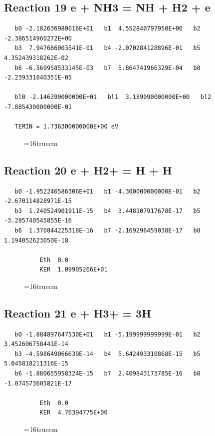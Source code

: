 \documentclass[12pt,dvipdfm]{article}
\begin{document}
\subsection{
Reaction 19 e + NH3 = NH + H2 + e }
\begin{small}\begin{verbatim}
   b0 -2.182636980016E+01   b1  4.552840797950E+00   b2 -2.386514960272E+00
   b3  7.947686003541E-01   b4 -2.070284128896E-01   b5  4.352439318262E-02
   b6 -6.569958533145E-03   b7  5.864741966329E-04   b8 -2.239331040351E-05

   bl0 -2.146390000000E+01   bl1  3.189090000000E+00   bl2 -7.885430000000E-01

   TEMIN = 1.736300000000E+00 eV
\end{verbatim}\end{small}
\begin{figure}[h!] \label{n2rates}
\epsfxsize=16truecm
\end{figure}
\newpage

\subsection{
Reaction 20 e + H2+ = H + H }
\begin{small}\begin{verbatim}
   b0 -1.952246586306E+01   b1 -4.300000000000E-01   b2 -2.670114828971E-15
   b3  1.240524901911E-15   b4  3.448107917678E-17   b5 -3.285740545855E-16
   b6  1.370844225318E-16   b7 -2.169296459038E-17   b8  1.194052623050E-18

          Eth  0.0
          KER  1.09905266E+01

\end{verbatim}\end{small}
\begin{figure}[h!] \label{n2rates}
\epsfxsize=16truecm
\end{figure}
\newpage

\subsection{
Reaction 21 e + H3+ = 3H }
\begin{small}\begin{verbatim}
   b0 -1.884897647530E+01   b1 -5.199999999999E-01   b2  3.452606758441E-14
   b3 -4.598649066639E-14   b4  5.642493310868E-15   b5  5.045818211316E-15
   b6 -1.880655958324E-15   b7  2.409843173785E-16   b8 -1.074573605821E-17

          Eth  0.0
          KER  4.76394775E+00

\end{verbatim}\end{small}
\begin{figure}[h!] \label{n2rates}
\epsfxsize=16truecm
\end{figure}
\newpage
\end{document}
